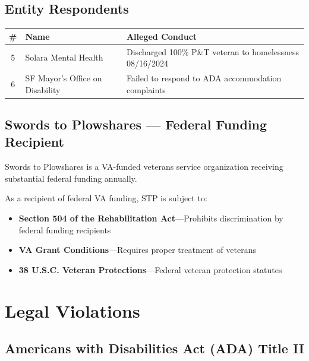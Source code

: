 \documentclass[12pt,letterpaper]{article}
\begin{document}
\subsection{Entity Respondents}

\begin{center}
\begin{longtable}{cll}
\toprule
\textbf{\#} & \textbf{Name} & \textbf{Alleged Conduct} \\
\midrule
\endhead
5 & Solara Mental Health & Discharged 100\% P\&T veteran to homelessness 08/16/2024 \\
6 & SF Mayor's Office on Disability & Failed to respond to ADA accommodation complaints \\
\bottomrule
\end{longtable}
\end{center}

\subsection{Swords to Plowshares --- Federal Funding Recipient}

Swords to Plowshares is a VA-funded veterans service organization receiving substantial federal funding annually.

As a recipient of federal VA funding, STP is subject to:
\begin{itemize}[noitemsep]
    \item \textbf{Section 504 of the Rehabilitation Act}---Prohibits discrimination by federal funding recipients
    \item \textbf{VA Grant Conditions}---Requires proper treatment of veterans
    \item \textbf{38 U.S.C. Veteran Protections}---Federal veteran protection statutes
\end{itemize}

\newpage

\section{Legal Violations}

\subsection{Americans with Disabilities Act (ADA) Title II}
\end{document}
